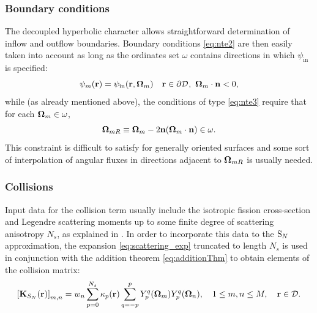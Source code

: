 \subsubsection{Boundary conditions}\label{sec:sn_bnd}
The decoupled hyperbolic character allows straightforward determination of inflow and outflow boundaries. Boundary
conditions \eqref{eq:nte2} are then easily taken into account as long as the ordinates set $\omega$ contains directions
in which $\psi_{\text{in}}$ is specified:
\begin{equation}\label{eq:bc_sn}
	\psi_m(\br) = \psi_{\text{in}}(\br, \bomega_m)\quad \br\in\pV, \ \bomega_m\cdot\bn < 0,
\end{equation}	
while (as already mentioned above), the conditions of type
\eqref{eq:nte3} require that for each $\bomega_m\in\omega$, 
$$
	\bomega_{mR} \equiv \bomega_m - 2 \bn (\bomega_m \cdot \bn) \in \omega.
$$
This constraint is difficult to satisfy for generally oriented surfaces and some sort of interpolation of angular fluxes
in directions adjacent to $\bomega_{mR}$ is usually needed.
 
\subsubsection{Collisions}
Input data for the collision term usually include the isotropic fission cross-section and Legendre scattering moments up
to some finite degree of scattering anisotropy $N_s$, as explained in . In
order to incorporate this data to the $\SN$ approximation, the expansion \eqref{eq:scattering_exp} truncated to length
$N_s$ is used in conjunction with the addition theorem \eqref{eq:additionThm} to obtain elements of the collision
matrix:
\begin{equation}\label{eq:KSN}
\left[\mathbf{K}_{S_N}(\br)\right]_{m,n} = 
w_n \suma[p]{0}{N_s}\kappa_p(\br)\suma[q]{-p}{p}\Y{p}{q}(\bomega_m)\Y{p}{q}(\bomega_n),\quad  1 \leq m,n \leq M, \quad
\br\in\VV.
\end{equation}

